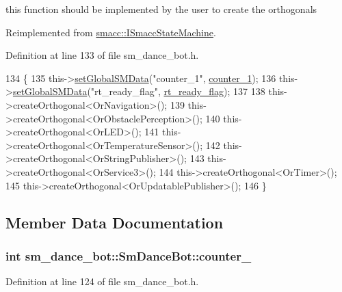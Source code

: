 this function should be implemented by the user to create the orthogonals 



Reimplemented from \hyperlink{classsmacc_1_1ISmaccStateMachine_ac2982c6c8283663e5e1e8a7c82f511ec}{smacc\+::\+I\+Smacc\+State\+Machine}.



Definition at line 133 of file sm\+\_\+dance\+\_\+bot.\+h.


\begin{DoxyCode}
134     \{
135         this->\hyperlink{classsmacc_1_1ISmaccStateMachine_a8588f9e580fbb95b53e2bd2ca3ff1f98}{setGlobalSMData}(\textcolor{stringliteral}{"counter\_1"}, \hyperlink{structsm__dance__bot_1_1SmDanceBot_ab3b8db557ce94d34c60b291911eb140c}{counter\_1});
136         this->\hyperlink{classsmacc_1_1ISmaccStateMachine_a8588f9e580fbb95b53e2bd2ca3ff1f98}{setGlobalSMData}(\textcolor{stringliteral}{"rt\_ready\_flag"}, \hyperlink{structsm__dance__bot_1_1SmDanceBot_a0f0587a13670ad8925555cd8f6cb6b2d}{rt\_ready\_flag});
137 
138         this->createOrthogonal<OrNavigation>();
139         this->createOrthogonal<OrObstaclePerception>();
140         this->createOrthogonal<OrLED>();
141         this->createOrthogonal<OrTemperatureSensor>();
142         this->createOrthogonal<OrStringPublisher>();
143         this->createOrthogonal<OrService3>();
144         this->createOrthogonal<OrTimer>();
145         this->createOrthogonal<OrUpdatablePublisher>();
146     \}
\end{DoxyCode}


\subsection{Member Data Documentation}
\subsubsection[{\texorpdfstring{counter\+\_\+1}{counter_1}}]{\setlength{\rightskip}{0pt plus 5cm}int sm\+\_\+dance\+\_\+bot\+::\+Sm\+Dance\+Bot\+::counter\+\_}\hypertarget{structsm__dance__bot_1_1SmDanceBot_ab3b8db557ce94d34c60b291911eb140c}{}\label{structsm__dance__bot_1_1SmDanceBot_ab3b8db557ce94d34c60b291911eb140c}


Definition at line 124 of file sm\+\_\+dance\+\_\+bot.\+h.

